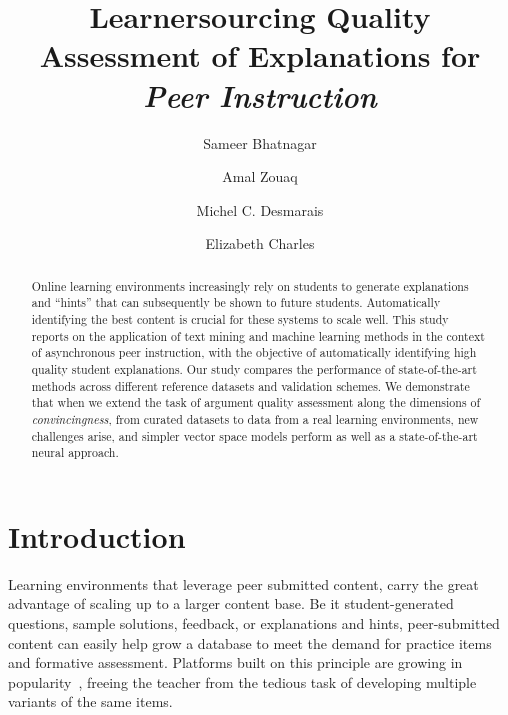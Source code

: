 \documentclass[runningheads]{llncs}
\begin{document}
%
\title{Learnersourcing Quality Assessment of Explanations for \textit{Peer 
Instruction}}
%
\author{Sameer Bhatnagar \and
Amal Zouaq \and
Michel C. Desmarais \and
Elizabeth Charles
}
%

%
\maketitle              %
%
\begin{abstract}
Online learning environments increasingly rely on students to generate 
explanations and ``hints'' that can subsequently be shown to future students. 
Automatically identifying the best content is crucial for these systems to 
scale well. 
This study reports on the application of text mining and machine learning 
methods in the context of asynchronous peer instruction, with the objective of 
automatically identifying high quality student explanations. 
Our study compares the performance of state-of-the-art methods across different 
reference datasets and validation schemes.
We demonstrate that when we extend the task of argument quality assessment 
along the dimensions of \textit{convincingness}, from curated datasets to data 
from a real learning environments, new challenges arise, and simpler vector 
space models perform as well as a state-of-the-art neural approach. 

\end{abstract}

\section{Introduction}

Learning environments that leverage peer submitted content, carry the great 
advantage of scaling up to a larger content base.  
Be it student-generated questions, sample solutions, feedback, or explanations 
and hints, peer-submitted content can easily help grow a database to meet the 
demand for practice items and formative assessment.
Platforms built on this principle are growing in 
popularity~\cite{denny_effect_2013}\cite{khosravi_ripple_2019}, freeing the 
teacher from the tedious task of developing multiple variants of the same 
items. 
\end{document}
